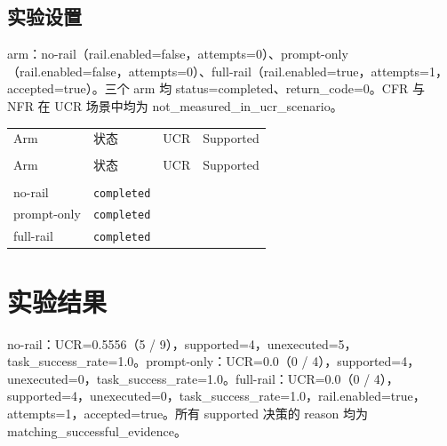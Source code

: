 \documentclass[UTF8]{ctexart}
\begin{document}
\subsection{实验设置}
arm：no-\allowbreak{}rail（rail.enabled=false，attempts=0）、prompt-\allowbreak{}only（rail.enabled=false，attempts=0）、full-\allowbreak{}rail（rail.enabled=true，attempts=1，accepted=true）。三个 arm 均 status=completed、return\_\allowbreak{}code=0。CFR 与 NFR 在 UCR 场景中均为 not\_\allowbreak{}measured\_\allowbreak{}in\_\allowbreak{}ucr\_\allowbreak{}scenario。
\begin{longtable}{@{}>{\raggedright\arraybackslash}p{}>{\raggedright\arraybackslash}p{}>{\raggedleft\arraybackslash}p{}>{\raggedleft\arraybackslash}p{}@{}}
\toprule
Arm & 状态 & UCR & Supported\\\\
\midrule
\endfirsthead
\toprule
Arm & 状态 & UCR & Supported\\\\
\midrule
\endhead
no-\allowbreak{}rail & \texttt{\scriptsize completed} & 0.5556 & 4 \\
prompt-\allowbreak{}only & \texttt{\scriptsize completed} & 0.0 & 4 \\
full-\allowbreak{}rail & \texttt{\scriptsize completed} & 0.0 & 4 \\
\bottomrule
\end{longtable}
\section{实验结果}
no-\allowbreak{}rail：UCR=0.5556（5 / 9），supported=4，unexecuted=5，task\_\allowbreak{}success\_\allowbreak{}rate=1.0。prompt-\allowbreak{}only：UCR=0.0（0 / 4），supported=4，unexecuted=0，task\_\allowbreak{}success\_\allowbreak{}rate=1.0。full-\allowbreak{}rail：UCR=0.0（0 / 4），supported=4，unexecuted=0，task\_\allowbreak{}success\_\allowbreak{}rate=1.0，rail.enabled=true，attempts=1，accepted=true。所有 supported 决策的 reason 均为 matching\_\allowbreak{}successful\_\allowbreak{}evidence。
\end{document}
